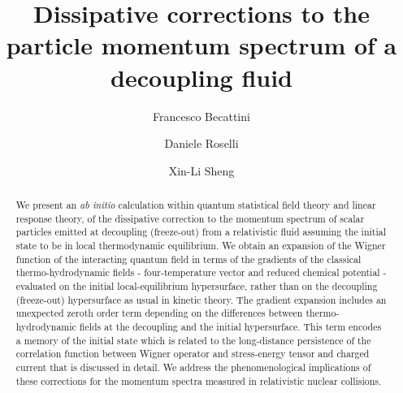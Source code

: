 \documentclass[prd,superscriptaddress,nofootinbib,notitlepage]{revtex4-1}
\begin{document}

\title{Dissipative corrections to the particle momentum spectrum of a decoupling fluid} 

\author{Francesco Becattini}

\author{Daniele Roselli}

\author{Xin-Li Sheng}

\begin{abstract}
We present an \emph{ab initio} calculation within quantum statistical field theory and linear response theory,
of the dissipative correction to the momentum spectrum of scalar particles emitted at decoupling (freeze-out) from a 
relativistic fluid assuming the initial state to be in local thermodynamic equilibrium. 
We obtain an expansion of the Wigner function of the interacting quantum field in terms of the gradients of the 
classical thermo-hydrodynamic fields - four-temperature vector and reduced chemical potential - evaluated on the 
initial local-equilibrium hypersurface, rather than on the decoupling (freeze-out) hypersurface as usual 
in kinetic theory. The gradient expansion includes an unexpected zeroth order term depending on the differences between 
thermo-hydrodynamic fields at the decoupling and the initial hypersurface. This term encodes a memory of the initial 
state which is related to the long-distance persistence of the correlation function between Wigner operator and stress-energy
tensor and charged current that is discussed in detail. We address the phenomenological implications of these corrections 
for the momentum spectra measured in relativistic nuclear collisions.
\end{abstract}
\end{document}
